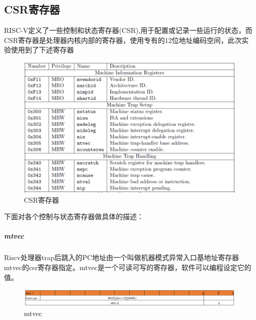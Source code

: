 \subsection{CSR寄存器}
RISC-V定义了一些控制和状态寄存器(CSR),用于配置或记录一些运行的状态，而CSR寄存器是处理器内核内部的寄存器，使用专有的12位地址编码空间，此次实验使用到了下述寄存器

\begin{figure}[H] %
    \centering %
    \includegraphics[width=1.0\textwidth]{figs/csrregs.png} %
    \caption{CSR寄存器} %
    \label{Fig.2} %
\end{figure}

下面对各个控制与状态寄存器做具体的描述：\\
\subparagraph{mtvec}
Riscv处理器trap后跳入的PC地址由一个叫做机器模式异常入口基地址寄存器mtvec的csr寄存器指定。mtvec是一个可读可写的寄存器，软件可以编程设定它的值。

\begin{figure}[H] %
    \centering %
    \includegraphics[width=1.0\textwidth]{figs/mtvec.png} %
    \caption{mtvec} %
    \label{Fig.3} %
\end{figure}



